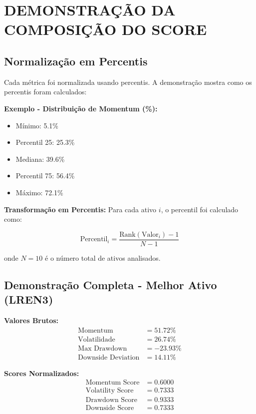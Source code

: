 \section{DEMONSTRAÇÃO DA COMPOSIÇÃO DO SCORE}

\subsection{Normalização em Percentis}

Cada métrica foi normalizada usando percentis. A demonstração mostra como os percentis foram calculados:

\textbf{Exemplo - Distribuição de Momentum (\%):}
\begin{itemize}
    \item Mínimo: 5.1\%
    \item Percentil 25: 25.3\%
    \item Mediana: 39.6\%
    \item Percentil 75: 56.4\%
    \item Máximo: 72.1\%
\end{itemize}

\textbf{Transformação em Percentis:}
Para cada ativo $i$, o percentil foi calculado como:

\begin{equation}
\text{Percentil}_i = \frac{\text{Rank}(\text{Valor}_i) - 1}{N - 1}
\end{equation}

onde $N = 10$ é o número total de ativos analisados.

\subsection{Demonstração Completa - Melhor Ativo (LREN3)}

\textbf{Valores Brutos:}
\begin{align}
\text{Momentum} &= 51.72\% \\
\text{Volatilidade} &= 26.74\% \\
\text{Max Drawdown} &= -23.93\% \\
\text{Downside Deviation} &= 14.11\%
\end{align}

\textbf{Scores Normalizados:}
\begin{align}
\text{Momentum Score} &= 0.6000 \\
\text{Volatility Score} &= 0.7333 \\
\text{Drawdown Score} &= 0.9333 \\
\text{Downside Score} &= 0.7333
\end{align}

